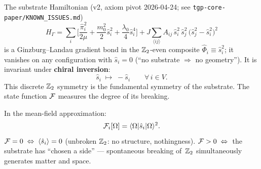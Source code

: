 \begin{proposition}\label{prop:Z2}
The substrate Hamiltonian (v2, axiom pivot 2026-04-24; see
\texttt{tgp-core-paper/KNOWN\_ISSUES.md})
\begin{equation}\label{eq:H-Gamma}
    H_\Gamma = \sum_i \biggl[
      \frac{\hat{\pi}_i^2}{2\mu}
    + \frac{m_0^2}{2}\hat{s}_i^2
    + \frac{\lambda_0}{4}\hat{s}_i^4
    \biggr]
    + J\!\sum_{\langle ij\rangle} A_{ij}\,
      \hat{s}_i^2\,\hat{s}_j^2\,
      \bigl(\hat{s}_j^2 - \hat{s}_i^2\bigr)^2
\end{equation}
is a Ginzburg--Landau gradient bond in the $\mathbb{Z}_2$-even composite
$\hat{\Phi}_i \equiv \hat{s}_i^2$; it vanishes on any configuration with
$\hat{s}_i = 0$ (``no substrate $\Rightarrow$ no geometry''). It is
invariant under \textbf{chiral inversion}:
\begin{equation}\label{eq:Z2-chiral}
    \hat{s}_i \;\mapsto\; -\hat{s}_i
    \qquad \forall\, i \in V.
\end{equation}
This discrete $\mathbb{Z}_2$ symmetry is the fundamental symmetry of the
substrate.  The state function $\mathcal{F}$ measures the degree of its
breaking.
\end{proposition}

\begin{corollary}\label{cor:F-s}
In the mean-field approximation:
\begin{equation}\label{eq:F-s-relation}
    \mathcal{F}_i[\Omega]
    = \langle\Omega|\hat{s}_i|\Omega\rangle^2.
\end{equation}
$\mathcal{F} = 0 \;\Leftrightarrow\;
\langle\hat{s}_i\rangle = 0$
(unbroken $\mathbb{Z}_2$: no structure, nothingness).
$\mathcal{F} > 0 \;\Leftrightarrow\;$ the substrate has ``chosen a side''
--- spontaneous breaking of~$\mathbb{Z}_2$ simultaneously generates matter
and space.
\end{corollary}
